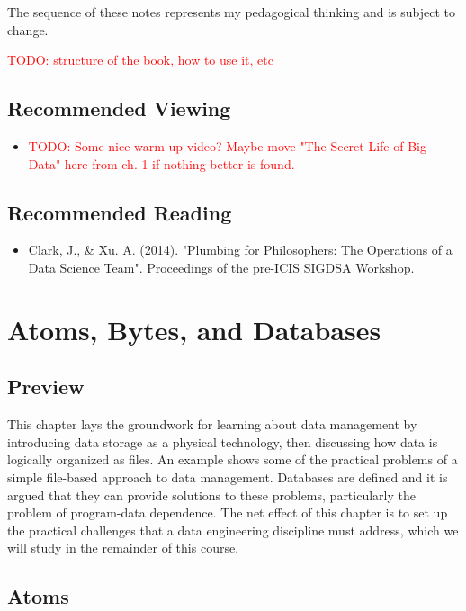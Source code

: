\documentclass[11pt]{book}
\newcommand{\todo}[1]{\textcolor{red}{TODO: #1}} %
\begin{document}
The sequence of these notes represents my pedagogical thinking and is subject to change.

\todo{structure of the book, how to use it, etc}

\section*{Recommended Viewing}
\begin{itemize}
    \item \todo{Some nice warm-up video? Maybe move "The Secret Life of Big Data" here from ch. 1 if nothing better is found.}
\end{itemize}

\section*{Recommended Reading}
\begin{itemize}
    \item Clark, J., \& Xu. A. (2014). "Plumbing for Philosophers: The Operations of a Data Science Team".  Proceedings of the pre-ICIS SIGDSA Workshop.
\end{itemize}

\mainmatter %



\chapter{Atoms, Bytes, and Databases}\label{ch:atoms}

\section*{Preview}

This chapter lays the groundwork for learning about data management by introducing data storage as a physical technology, then discussing how data is logically organized as files.  An example shows some of the practical problems of a simple file-based approach to data management.  Databases are defined and it is argued that they can provide solutions to these problems, particularly the problem of program-data dependence.  The net effect of this chapter is to set up the practical challenges that a data engineering discipline must address, which we will study in the remainder of this course.


\section{Atoms}
\end{document}

